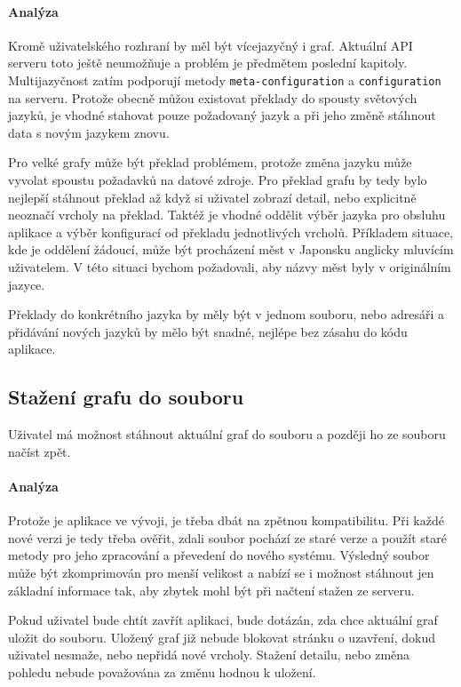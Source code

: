 \paragraph{Analýza} Kromě uživatelského rozhraní by měl být vícejazyčný i graf. Aktuální API serveru toto ještě neumožňuje a problém je předmětem poslední kapitoly. Multijazyčnost zatím podporují metody \texttt{meta-configuration} a \texttt{configuration} na serveru. Protože obecně můžou existovat překlady do spousty světových jazyků, je vhodné stahovat pouze požadovaný jazyk a při jeho změně stáhnout data s novým jazykem znovu.

Pro velké grafy může být překlad problémem, protože změna jazyku může vyvolat spoustu požadavků na datové zdroje. Pro překlad grafu by tedy bylo nejlepší stáhnout překlad až když si uživatel zobrazí detail, nebo explicitně neoznačí vrcholy na překlad. Taktéž je vhodné oddělit výběr jazyka pro obsluhu aplikace a výběr konfigurací od překladu jednotlivých vrcholů. Příkladem situace, kde je oddělení žádoucí, může být procházení měst v Japonsku anglicky mluvícím uživatelem. V této situaci bychom požadovali, aby názvy měst byly v originálním jazyce.

Překlady do konkrétního jazyka by měly být v jednom souboru, nebo adresáři a přidávání nových jazyků by mělo být snadné, nejlépe bez zásahu do kódu aplikace.

\subsection*{Stažení grafu do souboru}
Uživatel má možnost stáhnout aktuální graf do souboru a později ho ze souboru načíst zpět.

\paragraph{Analýza} Protože je aplikace ve vývoji, je třeba dbát na zpětnou kompatibilitu. Při každé nové verzi je tedy třeba ověřit, zdali soubor pochází ze staré verze a použít staré metody pro jeho zpracování a převedení do nového systému. Výsledný soubor může být zkomprimován pro menší velikost a nabízí se i možnost stáhnout jen základní informace tak, aby zbytek mohl být při načtení stažen ze serveru.

Pokud uživatel bude chtít zavřít aplikaci, bude dotázán, zda chce aktuální graf uložit do souboru. Uložený graf již nebude blokovat stránku o uzavření, dokud uživatel nesmaže, nebo nepřidá nové vrcholy. Stažení detailu, nebo změna pohledu nebude považována za změnu hodnou k uložení.

